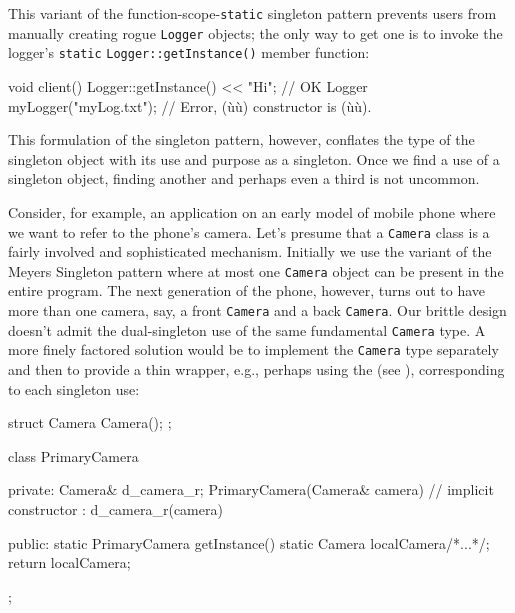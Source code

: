 \noindent This variant of the function-scope-\lstinline!static! singleton pattern
prevents users from manually creating rogue \lstinline!Logger! objects; the
only way to get one is to invoke the logger's \lstinline!static!
\lstinline!Logger::getInstance()! member function:

\begin{emcppslisting}[emcppsbatch=e10]
void client()
{
    Logger::getInstance() << "Hi";  // OK
    Logger myLogger("myLog.txt");   // Error, (ù{}ù) constructor is (ù{}ù).
}
\end{emcppslisting}

\noindent This formulation of the singleton pattern, however, conflates the type
of the singleton object with its use and purpose as a singleton. Once we
find a use of a singleton object, finding another and perhaps even a
third is not uncommon.  

Consider, for example, an application on an early
model of mobile phone where we want to refer to the phone's camera.
Let's presume that a \lstinline!Camera! class is a fairly involved and
sophisticated mechanism. Initially we use the variant of the Meyers
Singleton pattern where at most one \lstinline!Camera! object can be
present in the entire program. The next generation of the phone, however, turns out to have more than
one camera, say, a front \lstinline!Camera! and a back \lstinline!Camera!. Our
brittle design doesn't
admit the dual-singleton use of the same fundamental \lstinline!Camera!
type. A more finely factored solution would be to implement the
\lstinline!Camera! type separately and then to provide a thin wrapper,
e.g., perhaps using the  (see ), corresponding to each singleton
use:

\begin{emcppshiddenlisting}[emcppsbatch=e11]
struct Camera {
  Camera();
};    
\end{emcppshiddenlisting}
\begin{emcppslisting}[emcppsbatch=e11]
class PrimaryCamera
{
private:
    Camera& d_camera_r;
    PrimaryCamera(Camera& camera)  // implicit constructor
      : d_camera_r(camera) { }  

public:
    static PrimaryCamera getInstance()
    {
        static Camera localCamera{/*...*/};
        return localCamera;
    }
};
\end{emcppslisting}

